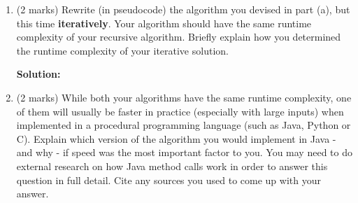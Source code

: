 \documentclass[a4,13pt]{extarticle}
\newenvironment{Solution}{\color{blue}\textbf{Solution:}}{}
\begin{document}
\begin{enumerate}
\begin{enumerate}
\begin{enumerate}
	      	      	\begin{Solution}
	      	        \end{Solution}
	      	
	      	      	\item (1 mark) Use the master theorem to find a Big-$\Theta$ bound for the recurrence defined by $$T(n)=5 \cdot T\left(\frac{n}{3}\right) + n^2 + 2n$$ and $T(1)=100$. Show all working.
	      	      	      	
	      	      	\begin{Solution}
	      	        \end{Solution}
	      	
	      	      	\item (1 mark) Use the master theorem to find a Big-$\Theta$ bound for the recurrence defined by $$T(n)=8 \cdot T\left(\frac{n}{4}\right) + 5n + 2\log n +\frac 1n $$ and $T(1)=1$. Show all working.
	      	      	
	      	      	\begin{Solution}
	      	        \end{Solution}
	      	      \end{enumerate}
	      	      	      	                  
	      	\item (2 marks) Rewrite (in pseudocode) the algorithm you devised in part (a), but this time \textbf{iteratively}. 
	      	      Your algorithm should have the same runtime complexity of your recursive algorithm. Briefly explain how you determined the runtime complexity of your iterative solution.
	      	      
	      	\begin{Solution}
	      	\end{Solution}
	      	      	      	                  
	      	\item (2 marks) While both your algorithms have the same runtime complexity, one of them will usually be faster in practice 
	      	      (especially with large inputs) when implemented in a procedural programming language (such as Java, Python or C). 
	      	      Explain which version of the algorithm you would implement in Java - and why - if speed was the most important factor to you. 
	      	      You may need to do external research on how Java method calls work in order to answer this question in full detail. 
	      	      Cite any sources you used to come up with your answer.\\
	      	      	      	                  

\end{enumerate}
\end{enumerate}
\end{document}

